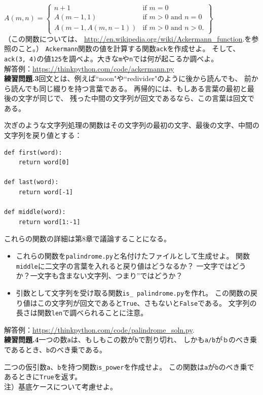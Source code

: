 \documentclass[a4j,12pt,makeidx]{jbook}
\newcommand{\tp}{\thechapter}
\begin{document}
$
A(m, n) = \left\{\begin{array}{ll}
             n+1 & \mbox{if } m = 0 \\ 
        A(m-1, 1) & \mbox{if } m > 0 \mbox{ and } n = 0 \\ 
A(m-1, A(m, n-1)) & \mbox{if } m > 0 \mbox{ and } n > 0.
\end{array}\right\}
$
\\

\noindent
（この関数については、 \url{http://en.wikipedia.org/wiki/Ackermann_function}.を参照のこと。）
{\tt Ackermann}関数の値を計算する関数{\tt ack}を作成せよ。
そして、{\tt ack(3, 4)}の値{\tt 125}を調べよ。大きな{\tt m}や{\tt n}では何が起こるか調べよ。\\
解答例：\url{https://thinkpython.com/code/ackermann.py} \\

\noindent
{\bf 練習問題\tp.3}回文とは、例えば``noon"や``redivider"のように後から読んでも、
前から読んでも同じ綴りを持つ言葉である。
再帰的には、もしある言葉の最初と最後の文字が同じで、
残った中間の文字列が回文であるなら、この言葉は回文である。\par
次ぎのような文字列処理の関数はその文字列の最初の文字、最後の文字、中間の文字列を戻り値とする：
\begin{verbatim}
def first(word):
    return word[0]

def last(word):
    return word[-1]

def middle(word):
    return word[1:-1]
\end{verbatim}
これらの関数の詳細は第8章で議論することになる。
\begin{itemize}
\item これらの関数を{\tt palindrome.py}と名付けたファイルとして生成せよ。
関数{\tt middle}に二文字の言葉を入れると戻り値はどうなるか？
一文字ではどうか？一文字も含まない文字列、つまり''ではどうか？
\item 引数として文字列を受け取る関数{\tt is\_ palindrome.py}を作れ。
この関数の戻り値はこの文字列が回文であると{\tt True}、さもないと{\tt False}である。
文字列の長さは関数{\tt len}で調べられることに注意。
\end{itemize} 
解答例：\url{https://thinkpython.com/code/palindrome_soln.py}. \\

\noindent
{\bf 練習問題\tp.4}一つの数{\tt a}は、もしもこの数が{\tt b}で割り切れ、
しかも{\tt a/b}が{\tt ｂ}のべき乗であるとき、{\tt b}のべき乗である。\par
二つの仮引数{\tt a}、{\tt b}を持つ関数i{\tt s\_power}を作成せよ。
この関数は{\tt a}が{\tt b}のべき乗であるときに{\tt True}を返す。 \\
注）基底ケースについて考慮せよ。\\
\end{document}
